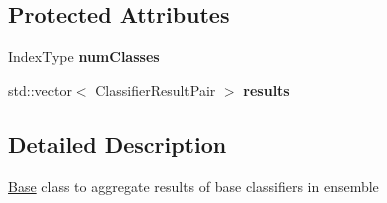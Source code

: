 \subsection*{Protected Attributes}
\begin{DoxyCompactItemize}
\item 
\hypertarget{classffactory_1_1_base_ensemble_aggregator_a8d1913069526ac8a2306e138e94ae289}{Index\-Type {\bfseries num\-Classes}}\label{classffactory_1_1_base_ensemble_aggregator_a8d1913069526ac8a2306e138e94ae289}

\item 
\hypertarget{classffactory_1_1_base_ensemble_aggregator_af06791db8fb81e1d14e5f7c91f414e42}{std\-::vector$<$ Classifier\-Result\-Pair $>$ {\bfseries results}}\label{classffactory_1_1_base_ensemble_aggregator_af06791db8fb81e1d14e5f7c91f414e42}

\end{DoxyCompactItemize}


\subsection{Detailed Description}
\hyperlink{classffactory_1_1_base}{Base} class to aggregate results of base classifiers in ensemble 

